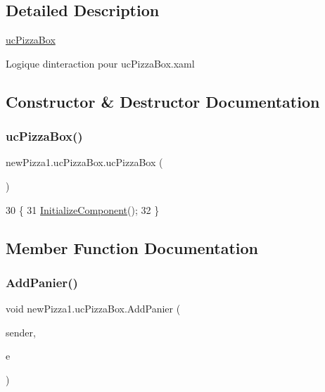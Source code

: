\subsection{Detailed Description}
\hyperlink{classnewPizza1_1_1ucPizzaBox}{uc\+Pizza\+Box} 

Logique d\textquotesingle{}interaction pour uc\+Pizza\+Box.\+xaml 

\subsection{Constructor \& Destructor Documentation}
\mbox{\label{classnewPizza1_1_1ucPizzaBox_a2065c5b42e15eb08893bfe6f4c234234}} 
\subsubsection{\texorpdfstring{uc\+Pizza\+Box()}{ucPizzaBox()}}
{\footnotesize\ttfamily new\+Pizza1.\+uc\+Pizza\+Box.\+uc\+Pizza\+Box (\begin{DoxyParamCaption}{ }\end{DoxyParamCaption})\hspace{0.3cm}{\ttfamily [inline]}}


\begin{DoxyCode}
30         \{
31             \hyperlink{classnewPizza1_1_1ucPizzaBox_a0bf3486ff05489987fc9b6766aec72d1}{InitializeComponent}();
32         \}
\end{DoxyCode}


\subsection{Member Function Documentation}
\mbox{\label{classnewPizza1_1_1ucPizzaBox_a01dc4464850976521aa8c0bc7fff190a}} 
\subsubsection{\texorpdfstring{Add\+Panier()}{AddPanier()}}
{\footnotesize\ttfamily void new\+Pizza1.\+uc\+Pizza\+Box.\+Add\+Panier (\begin{DoxyParamCaption}\item[{object}]{sender,  }\item[{Routed\+Event\+Args}]{e }\end{DoxyParamCaption})\hspace{0.3cm}{\ttfamily [inline]}}


